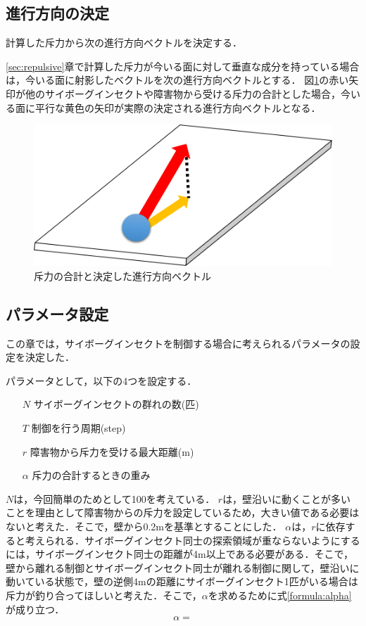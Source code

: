 \documentclass[a4paper,11pt]{jarticle}
\begin{document}
	
	\subsection{進行方向の決定}
	\label{sec:decide}
	計算した斥力から次の進行方向ベクトルを決定する．
	
	\ref{sec:repulsive}章で計算した斥力が今いる面に対して垂直な成分を持っている場合は，今いる面に射影したベクトルを次の進行方向ベクトルとする．
	図\ref{fig:repulsive}の赤い矢印が他のサイボーグインセクトや障害物から受ける斥力の合計とした場合，今いる面に平行な黄色の矢印が実際の決定される進行方向ベクトルとなる．
	\begin{figure}
		\centering
		\includegraphics[width=0.35\linewidth]{png/repulsive.png}
		\caption[斥力の射影]{斥力の合計と決定した進行方向ベクトル}
		\label{fig:repulsive}
	\end{figure}
	
	\subsection{パラメータ設定}
	この章では，サイボーグインセクトを制御する場合に考えられるパラメータの設定を決定した．
	
	パラメータとして，以下の4つを設定する．
	
	\begin{itemize}
		\item[$N$] サイボーグインセクトの群れの数(匹)
		\item[$T$] 制御を行う周期(step)
		\item[$r$] 障害物から斥力を受ける最大距離(m)
		\item[$\alpha$] 斥力の合計するときの重み
	\end{itemize}

	$N$は，今回簡単のためとして100を考えている．
	$r$は，壁沿いに動くことが多いことを理由として障害物からの斥力を設定しているため，大きい値である必要はないと考えた．そこで，壁から0.2mを基準とすることにした．
	$\alpha$は，$r$に依存すると考えられる．サイボーグインセクト同士の探索領域が重ならないようにするには，サイボーグインセクト同士の距離が4m以上である必要がある．そこで，壁から離れる制御とサイボーグインセクト同士が離れる制御に関して，壁沿いに動いている状態で，壁の逆側4mの距離にサイボーグインセクト1匹がいる場合は斥力が釣り合ってほしいと考えた．そこで，$\alpha$を求めるために式\ref{formula:alpha}が成り立つ．
	\begin{equation}
	\label{formula:alpha}
	\alpha = 
	\end{equation}
	
\end{document}
